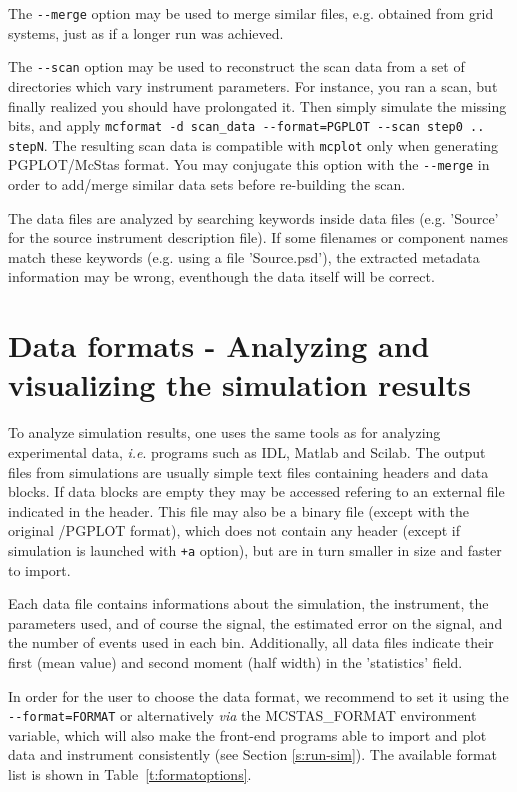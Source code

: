 The \verb+--merge+ option may be used to merge similar files, e.g. obtained from grid systems, just as if a longer run was achieved.

The \verb+--scan+ option may be used to reconstruct the scan data from a set of directories which vary instrument parameters. For instance, you ran a scan, but finally realized you should have prolongated it. Then simply simulate the missing bits, and apply \verb+mcformat -d scan_data --format=PGPLOT --scan step0 .. stepN+. The resulting scan data is compatible with \verb+mcplot+ only when generating PGPLOT/McStas format. You may conjugate this option with the \verb+--merge+ in order to add/merge similar data sets before re-building the scan.

The data files are analyzed by searching keywords inside data files (e.g. 'Source' for the source instrument description file). If some filenames or component names match these keywords (e.g. using a file 'Source.psd'), the extracted metadata information may be wrong, eventhough the data itself will be correct.

\section{Data formats - Analyzing and visualizing the simulation results}
\label{s:analyze}

To analyze simulation results, one uses the same tools as for analyzing
experimental data, \textit{i.e}. programs such as IDL, Matlab and Scilab.
The output files from simulations are usually simple text files containing headers and data blocks. If data blocks are empty they may be accessed refering to an external file indicated in the header. This file may also be a binary file (except with the original \MCS /PGPLOT format), which does not contain any header (except if simulation is launched with \verb|+a| option), but are in turn smaller in size and faster to import.

Each data file contains informations about the simulation, the instrument, the parameters used, and of course the signal, the estimated error on the signal, and the number of events used in each bin. Additionally, all data files indicate their first (mean value) and second moment (half width) in the 'statistics' field.

In order for the user to choose the data format, we recommend to set it using the \verb+--format=FORMAT+ or alternatively {\it via} the MCSTAS\_FORMAT environment variable, which will also make the front-end programs able to import and plot data and instrument consistently (see Section \ref{s:run-sim}). The available format list is shown in Table~\ref{t:formatoptions}. 

